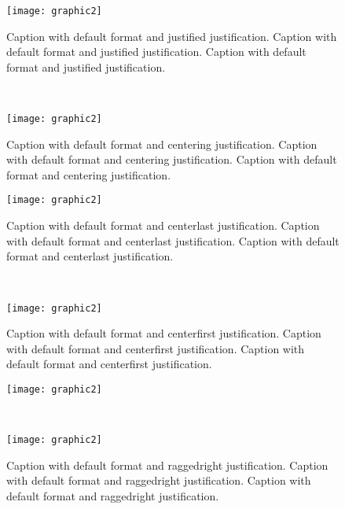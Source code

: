 \begin{figure}[tp]
	\centering
	\begin{minipage}{0.45\linewidth}
		\texttt{[image: graphic2]}
		\captionsetup{format=default,justification=justified}
		\caption{Caption with default format and justified justification.
			Caption with default format and justified justification.
			Caption with default format and justified justification.}
		\label{fig:caption-format-ex2-justified}
	\end{minipage}\\[1em]
	\begin{minipage}{0.45\linewidth}
		\texttt{[image: graphic2]}
		\captionsetup{format=default,justification=centering}
		\caption{Caption with default format and centering justification.
			Caption with default format and centering justification.
			Caption with default format and centering justification.}
		\label{fig:caption-format-ex2-centering}
	\end{minipage}\hfill
	\begin{minipage}{0.45\linewidth}
		\texttt{[image: graphic2]}
		\captionsetup{format=default,justification=centerlast}
		\caption{Caption with default format and centerlast justification.
			Caption with default format and centerlast justification.
			Caption with default format and centerlast justification.}
		\label{fig:caption-format-ex2-centerlast}
	\end{minipage}\\[1em]
	\begin{minipage}{0.45\linewidth}
		\texttt{[image: graphic2]}
		\captionsetup{format=default,justification=centerfirst}
		\caption{Caption with default format and centerfirst justification.
			Caption with default format and centerfirst justification.
			Caption with default format and centerfirst justification.}
		\label{fig:caption-format-ex2-centerfirst}
	\end{minipage}\hfill
	\begin{minipage}{0.45\linewidth}
		\texttt{[image: graphic2]}
		\captionsetup{format=default,justification=raggedright}
		\caption{Caption with default format and raggedright justification.
			Caption with default format and raggedright justification.
			Caption with default format and raggedright justification.}
		\label{fig:caption-format-ex2-raggedright}
	\end{minipage}\\[1em]
	\begin{minipage}{0.45\linewidth}
		\texttt{[image: graphic2]}
		\captionsetup{format=default,justification=RaggedRight}

\end{minipage}
\end{figure}
